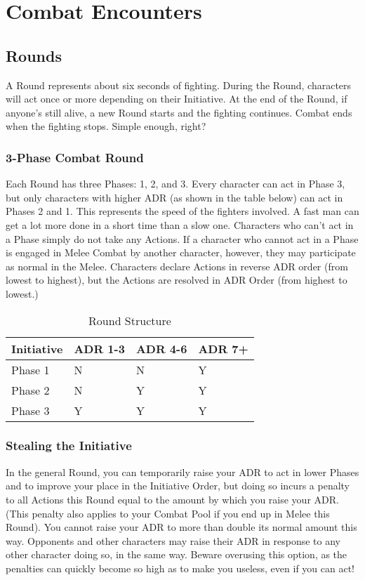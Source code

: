 \documentclass[oneside,11pt,english]{book}
\begin{document}
\section{Combat Encounters}
\subsection{Rounds}
A Round represents about six seconds of fighting. During the Round, characters will act once or more
depending on their Initiative. At the end of the Round, if anyone’s still alive, a new Round starts and the
fighting continues. Combat ends when the fighting stops. Simple enough, right?
\subsubsection{3-Phase Combat Round}
Each Round has three Phases: 1, 2, and 3. Every character can act in Phase 3, but only characters with
higher ADR (as shown in the table below) can act in Phases 2 and 1. This represents the speed of the
fighters involved. A fast man can get a lot more done in a short time than a slow one. Characters who
can’t act in a Phase simply do not take any Actions. If a character who cannot act in a Phase is engaged in
Melee Combat by another character, however, they may participate as normal in the Melee.
Characters declare Actions in reverse ADR order (from lowest to highest), but the Actions are resolved in ADR Order (from highest to lowest.)
\begin{table}[!hb]
	\centering
	\caption{Round Structure}
	\label{tab:Round Structure}
	\begin{tabu} spread 0pt {X[2,l] *{3}{X}}
		Initiative&ADR 1-3&ADR 4-6&ADR 7+\\\toprule
		Phase 1&  	N  &	N & 	Y\\
		Phase 2&  	N  &	Y & 	Y\\
		Phase 3&  	Y  &	Y & 	Y\\
	\end{tabu}
\end{table}
\subsubsection{Stealing the Initiative}
In the general Round, you can temporarily raise your ADR to act in lower Phases and to improve your
place in the Initiative Order, but doing so incurs a penalty to all Actions this Round equal to the amount
by which you raise your ADR. (This penalty also applies to your Combat Pool if you end up in Melee this
Round). You cannot raise your ADR to more than double its normal amount this way. Opponents and
other characters may raise their ADR in response to any other character doing so, in the same way.
Beware overusing this option, as the penalties can quickly become so high as to make you useless, even if
you can act!
\end{document}
